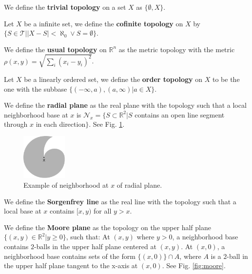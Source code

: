 \documentclass[12pt]{book}
\begin{document}
\begin{example}
	We define the {\bf trivial topology} on a set $X$ as $\{\emptyset,X\}$.
\end{example}

\begin{example}
	Let $X$ be a infinite set, we define the {\bf cofinite topology} on $X$ by $\{S\in \mathcal T||X-S|<\aleph_0\vee S=\emptyset\}$.
\end{example}

\begin{example}
	We define the {\bf usual topology} on $\mathbb R^n$ as the metric topology with the metric $\rho(x,y)=\sqrt{\sum_i(x_i-y_i)^2}$.
\end{example}

\begin{example}
	Let $X$ be a linearly ordered set, we define the {\bf order topology} on $X$ to be the one with the subbase $\{(-\infty,a),(a,\infty)|a\in X\}$.
\end{example}

\begin{example}
	We define the {\bf radial plane} as the real plane with the topology such that a local neighborhood base at $x$ is $\mathcal N_x=\{S\subset \mathbb R^2|S$ contains an open line segment through $x$ in each direction$\}$. See Fig. \ref{fig:radial}.
\end{example}

\begin{figure}[htb!]
	\centering  
	\includegraphics[width=0.2\textwidth ]{resources/chap_topo_spc/radial.pdf}  
	\caption{Example of neighborhood at $x$ of radial plane.}
	\label{fig:radial}
\end{figure}

\begin{example}
	We define the {\bf Sorgenfrey line} as the real line with the topology such that a local base at $x$ contains $[x,y)$ for all $y>x$.
\end{example}

\begin{example}
	We define the {\bf Moore plane} as the topology on the upper half plane $\{(x,y)\in \mathbb R^2|y\geq 0\}$, such that: At $(x,y)$ where $y>0$, a neighborhood base contains $2$-balls in the upper half plane centered at $(x,y)$. At $(x,0)$, a neighborhood base contains sets of the form $\{(x,0)\}\cap A$, where $A$ is a $2$-ball in the upper half plane tangent to the x-axis at $(x,0)$. See Fig. \ref{fig:moore}.
\end{example}
\end{document}
